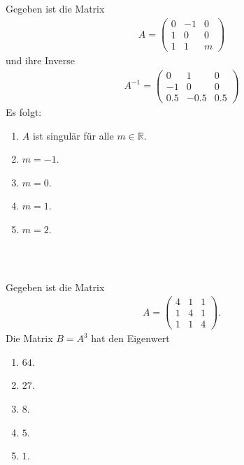 \subsection*{}
Gegeben ist die Matrix
\begin{align*}
	A =
	\begin{pmatrix}
		0 & -1 & 0 \\
		1 & 0 & 0 \\
		1 & 1 & m
	\end{pmatrix}
\end{align*}
und ihre Inverse
\begin{align*}
		A^{-1} =
	\begin{pmatrix}
		0 & 1 & 0 \\
		-1 & 0 & 0 \\
		0.5 & -0.5 &0.5
	\end{pmatrix}
\end{align*}
Es folgt:
\renewcommand{\labelenumi}{(\alph{enumi})}
\begin{enumerate}
	\item 
	$ A $ ist singulär für alle $ m \in \mathbb{R} $.
	\item 
	$ m = -1 $.
	\item
	$ m = 0 $.
	\item
	$ m = 1 $.
	\item
	$ m = 2 $.
\end{enumerate}
\ \\
\subsection*{}
Gegeben ist die Matrix
\begin{align*}
	A =
	\begin{pmatrix}
		4 & 1 & 1 \\
		1 & 4 & 1 \\
		1 & 1 & 4
	\end{pmatrix}.
\end{align*}
Die Matrix $ B = A^3 $ hat den Eigenwert
\renewcommand{\labelenumi}{(\alph{enumi})}
\begin{enumerate}
\item
$ 64 $.
\item
$ 27 $.	
\item 
$ 8 $.
\item
$ 5 $.
\item
$ 1 $.
\end{enumerate}
\ \\
